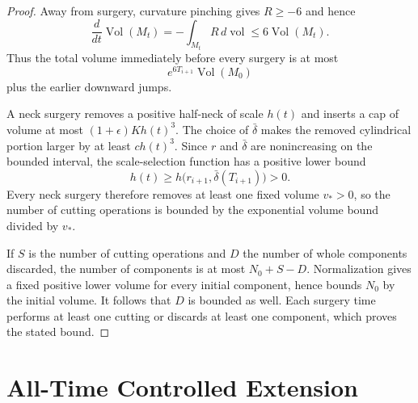 \begin{proof}
Away from surgery, curvature pinching gives $R\ge-6$ and hence
\[
 \frac d{dt}\operatorname{Vol}(M_t)
 =-\int_{M_t}R\,d\operatorname{vol}
 \le6\operatorname{Vol}(M_t).
\]
Thus the total volume immediately before every surgery is at most
\[
 e^{6T_{i+1}}\operatorname{Vol}(M_0)
\]
plus the earlier downward jumps.

A neck surgery removes a positive half-neck of scale $h(t)$ and inserts a
cap of volume at most $(1+\epsilon)Kh(t)^3$.  The choice of
$\bar\delta$ makes the removed cylindrical portion larger by at least
$c h(t)^3$.  Since $r$ and $\bar\delta$ are nonincreasing on the bounded
interval, the scale-selection function has a positive lower bound
\[
 h(t)\ge h\bigl(r_{i+1},\bar\delta(T_{i+1})\bigr)>0.
\]
Every neck surgery therefore removes at least one fixed volume $v_*>0$, so
the number of cutting operations is bounded by the exponential volume bound
divided by $v_*$.

If $S$ is the number of cutting operations and $D$ the number of whole
components discarded, the number of components is at most $N_0+S-D$.
Normalization gives a fixed positive lower volume for every initial
component, hence bounds $N_0$ by the initial volume.  It follows that $D$ is
bounded as well.  Each surgery time performs at least one cutting or discards
at least one component, which proves the stated bound.
\end{proof}

\section{All-Time Controlled Extension}

